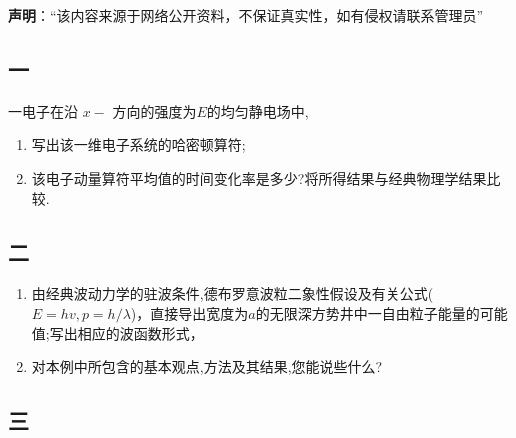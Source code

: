 
\textbf{声明}：“该内容来源于网络公开资料，不保证真实性，如有侵权请联系管理员”

\subsection{一}
一电子在沿 $x-$ 方向的强度为$E$的均匀静电场中,
\begin{enumerate}
\item 写出该一维电子系统的哈密顿算符;
\item 该电子动量算符平均值的时间变化率是多少?将所得结果与经典物理学结果比较.
\end{enumerate}
\subsection{二}
\begin{enumerate}
\item 由经典波动力学的驻波条件,德布罗意波粒二象性假设及有关公式($E=hv,p=h/\lambda$)，直接导出宽度为$a$的无限深方势井中一自由粒子能量的可能值;写出相应的波函数形式，
\item 对本例中所包含的基本观点,方法及其结果,您能说些什么?
\end{enumerate}
\subsection{三}
